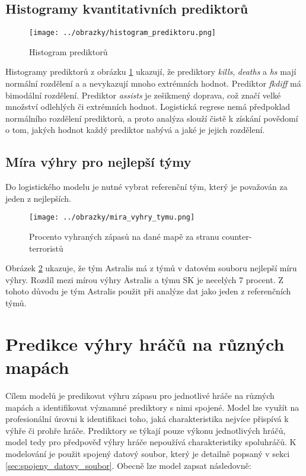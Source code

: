 \subsection{Histogramy kvantitativních prediktorů}

\begin{figure}[H]
    \centering
    \texttt{[image: ../obrazky/histogram\_prediktoru.png]}
    \caption{Histogram prediktorů} 
    \label{fig:histogram_prediktoru}
\end{figure}

Histogramy prediktorů z obrázku \ref{fig:histogram_prediktoru} ukazují, že prediktory \textit{kills}, \textit{deaths} a \textit{hs} mají normální rozdělení
a a nevykazují mnoho extrémních hodnot. Prediktor \textit{fkdiff} má bimodální rozdělení. Prediktor \textit{assists} je 
zešikmený doprava, což značí velké množství odlehlých či extrémních hodnot. Logistická regrese nemá předpoklad normálního rozdělení prediktorů, a proto analýza
slouží čistě k získání povědomí o tom, jakých hodnot každý prediktor nabývá a jaké je jejich rozdělení.

\subsection{Míra výhry pro nejlepší týmy}
Do logistického modelu je nutné vybrat referenční tým, který je považován za jeden z nejlepších. 

\begin{figure}[H]
    \centering
    \texttt{[image: ../obrazky/mira\_vyhry\_tymu.png]}
    \caption{Procento vyhraných zápasů na dané mapě za stranu counter-terroristů} 
    \label{fig:mira_vyhry_tymu}
\end{figure}

Obrázek \ref{fig:mira_vyhry_tymu} ukazuje, že tým Astralis má z týmů v datovém souboru nejlepší míru výhry. Rozdíl mezi mírou výhry Astralis a týmu SK je necelých 7 procent.
Z tohoto důvodu je tým Astralis použit při analýze dat jako jeden z referenčních týmů.

\newpage
\section{Predikce výhry hráčů na různých mapách}
Cílem modelů je predikovat výhru zápasu pro jednotlivé hráče na různých mapách a identifikovat významné prediktory s nimi spojené. Model lze využít na profesionální
úrovni k identifikaci toho, jaká charakteristika nejvíce přispívá k výhře či prohře hráče. Prediktory se týkají pouze výkonu jednotlivých
hráčů, model tedy pro předpověď výhry hráče nepoužívá charakteristiky spoluhráčů. K modelování je použit spojený datový soubor, který je detailně popsaný v
sekci \ref{sec:spojeny_datovy_soubor}. Obecně lze model zapsat následovně:

